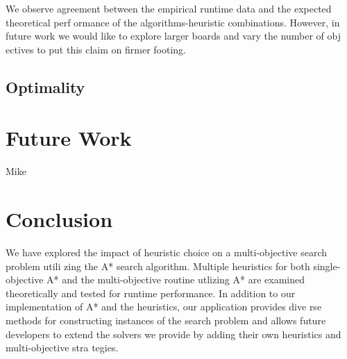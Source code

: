 \documentclass[12pt, conference, compsocconf]{IEEEtran}
\begin{document}
We observe agreement between the empirical runtime data and the expected theoretical perf
ormance of the algorithms-heuristic combinations.
However, in future work we would like to explore larger boards and vary the number of obj
ectives to put this claim on firmer footing.


\subsection{Optimality}


\section{Future Work}
Mike

\section{Conclusion}
We have explored the impact of heuristic choice on a multi-objective search problem utili
zing the A* search algorithm.
Multiple heuristics for both single-objective A* and the multi-objective routine utlizing A* are examined theoretically and tested for runtime performance.
In addition to our implementation of A* and the heuristics, our application provides dive
rse methods for constructing instances of the search problem and allows future developers
 to extend the solvers we provide by adding their own heuristics and multi-objective stra
tegies.




\end{document}
